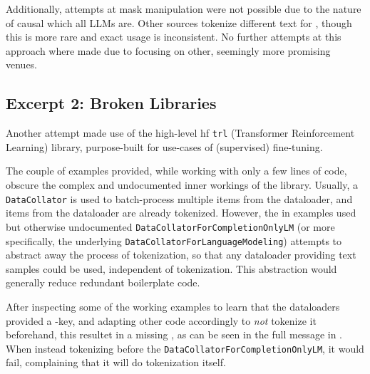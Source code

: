 Additionally, attempts at mask manipulation were not possible due to the nature of \gls{causal} which all \glspl{LLM} are.
Other sources tokenize different text for , though this is more rare and exact usage is inconsistent.
No further attempts at this approach where made due to focusing on other, seemingly more promising venues.


\subsection{Excerpt 2: Broken Libraries}\label{sub:libraries}
Another attempt made use of the high-level \gls{hf} \texttt{trl} (Transformer Reinforcement Learning) library, purpose-built for use-cases of (supervised) fine-tuning.

\begin{sloppypar}
The couple of examples provided, while working with only a few lines of code, obscure the complex and undocumented inner workings of the library.
Usually, a \texttt{DataCollator} is used to batch-process multiple items from the dataloader, and items from the dataloader are already tokenized.
However, the in examples used but otherwise undocumented \texttt{DataCollatorForCompletionOnlyLM} (or more specifically, the underlying \texttt{DataCollatorForLanguageModeling}) attempts to abstract away the process of tokenization, so that any dataloader providing text samples could be used, independent of tokenization.
This abstraction would generally reduce redundant boilerplate code.
\end{sloppypar}


\begin{sloppypar}
After inspecting some of the working examples to learn that the dataloaders provided a -key, and adapting other code accordingly to \textit{not} tokenize it beforehand, this resultet in a  missing , as can be seen in the full message in .
When instead tokenizing before the \texttt{DataCollatorForCompletionOnlyLM}, it would fail, complaining that it will do tokenization itself.
\end{sloppypar}

